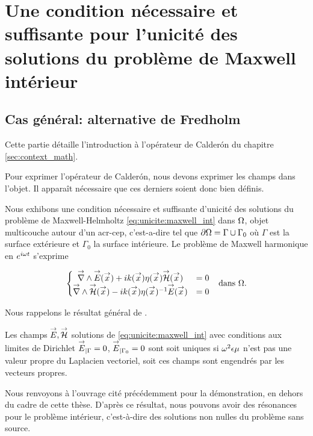 \section[Une CNS pour l'unicité des solutions du problème de Maxwell intérieur]{Une condition nécessaire et suffisante pour l'unicité des solutions du problème de Maxwell intérieur}
  \subsection{Cas général: alternative de Fredholm}

    Cette partie détaille l'introduction à l'opérateur de Calderón du chapitre \ref{sec:context_math}.

    Pour exprimer l'opérateur de Calderón,
    nous devons exprimer les champs dans l'objet. Il apparaît nécessaire que ces derniers soient donc bien définis.

    Nous exhibons une condition nécessaire et suffisante d'unicité des solutions du problème de Maxwell-Helmholtz  \eqref{eq:unicite:maxwell_int} dans \(\Omega\), objet multicouche autour d'un \gls{acr-cep}, c'est-a-dire tel que \(\partial \Omega = \Gamma \cup \Gamma_0\) où \(\Gamma\) est la surface extérieure et \(\Gamma_0\) la surface intérieure. Le problème de Maxwell harmonique en \(e^{i\omega t}\) s'exprime

    \begin{align}
    \left\lbrace
      \begin{matrix}
        {\overset{\rightarrow}{\nabla}}\wedge {\overset{\rightarrow}{E}}({\overset{\rightarrow}{x}}) + i k({\overset{\rightarrow}{x}})\eta({\overset{\rightarrow}{x}}) {\overset{\rightarrow}{\mathcal{H}}}({\overset{\rightarrow}{x}}) &= 0
        \\
        {\overset{\rightarrow}{\nabla}}\wedge {\overset{\rightarrow}{\mathcal{H}}}({\overset{\rightarrow}{x}}) - i k({\overset{\rightarrow}{x}})\eta({\overset{\rightarrow}{x}})^{-1} {\overset{\rightarrow}{E}}({\overset{\rightarrow}{x}}) &= 0
      \end{matrix}
      \right. && \text{dans \(\Omega\).}
      \label{eq:unicite:maxwell_int}
    \end{align}

    Nous rappelons le résultat général de \cite[Théorème~8, p.~111]{cessenat_mathematical_1996}.
    \begin{thm}
      Les champs \({\overset{\rightarrow}{E}},{\overset{\rightarrow}{\mathcal{H}}}\) solutions de \eqref{eq:unicite:maxwell_int} avec conditions aux limites de Dirichlet \({\overset{\rightarrow}{E}}_{|\Gamma} = 0\), \({\overset{\rightarrow}{E}}_{|\Gamma_0} = 0\) sont soit uniques si \(\omega^2\epsilon\mu\) n'est pas une valeur propre du Laplacien vectoriel, soit ces champs sont engendrés par les vecteurs propres.
    \end{thm}
    Nous renvoyons à l'ouvrage cité précédemment pour la démonstration, en dehors du cadre de cette thèse.
    D'après ce résultat, nous pouvons avoir des résonances pour le problème intérieur, c'est-à-dire des solutions non nulles du problème sans source.

